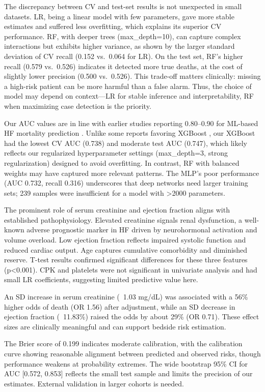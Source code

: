 \documentclass[12pt,a4paper]{article}
\begin{document}
The discrepancy between CV and test-set results is not unexpected in small datasets. LR, being a linear model with few parameters, gave more stable estimates and suffered less overfitting, which explains its superior CV performance. RF, with deeper trees (max\_depth=10), can capture complex interactions but exhibits higher variance, as shown by the larger standard deviation of CV recall (0.152 vs.\ 0.064 for LR). On the test set, RF’s higher recall (0.579 vs.\ 0.526) indicates it detected more true deaths, at the cost of slightly lower precision (0.500 vs.\ 0.526). This trade-off matters clinically: missing a high-risk patient can be more harmful than a false alarm. Thus, the choice of model may depend on context—LR for stable inference and interpretability, RF when maximizing case detection is the priority.

Our AUC values are in line with earlier studies reporting 0.80–0.90 for ML-based HF mortality prediction \cite{adler2020improving, luo2022machine}. Unlike some reports favoring XGBoost \cite{kwon2019artificial, luo2022machine}, our XGBoost had the lowest CV AUC (0.738) and moderate test AUC (0.747), which likely reflects our regularized hyperparameter settings (max\_depth=3, strong regularization) designed to avoid overfitting. In contrast, RF with balanced weights may have captured more relevant patterns. The MLP’s poor performance (AUC 0.732, recall 0.316) underscores that deep networks need larger training sets; 239 samples were insufficient for a model with >2000 parameters.

The prominent role of serum creatinine and ejection fraction aligns with established pathophysiology. Elevated creatinine signals renal dysfunction, a well-known adverse prognostic marker in HF driven by neurohormonal activation and volume overload. Low ejection fraction reflects impaired systolic function and reduced cardiac output. Age captures cumulative comorbidity and diminished reserve. T-test results confirmed significant differences for these three features (p<0.001). CPK and platelets were not significant in univariate analysis and had small LR coefficients, suggesting limited predictive value here.

An SD increase in serum creatinine (~1.03 mg/dL) was associated with a 56\% higher odds of death (OR 1.56) after adjustment, while an SD decrease in ejection fraction (~11.83\%) raised the odds by about 29\% (OR 0.71). These effect sizes are clinically meaningful and can support bedside risk estimation.

The Brier score of 0.199 indicates moderate calibration, with the calibration curve showing reasonable alignment between predicted and observed risks, though performance weakens at probability extremes. The wide bootstrap 95\% CI for AUC [0.572, 0.853] reflects the small test sample and limits the precision of our estimates. External validation in larger cohorts is needed.
\end{document}
